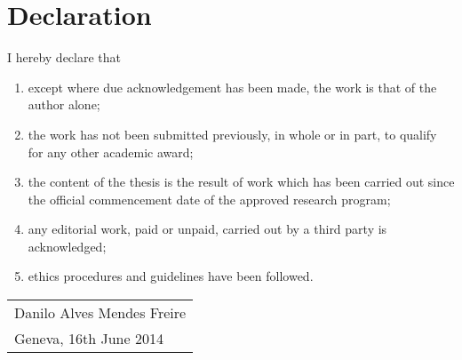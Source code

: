

\chapter*{Declaration} %

\thispagestyle{empty}

 
I hereby declare that

\begin{enumerate}
\item except where due acknowledgement has been made, the work is that of the author alone;
\item the work has not been submitted previously, in whole or in part, to qualify for any other academic award;
\item the content of the thesis is the result of work which has been carried out since the official commencement date of the approved research program;
\item any editorial work, paid or unpaid, carried out by a third party is acknowledged;
\item ethics procedures and guidelines have been followed.
\end{enumerate}

\bigskip
 

\smallskip

\begin{flushright}
\begin{tabular}{m{6cm}}
\\ \hline
\centering Danilo Alves Mendes Freire\\Geneva, 16th June 2014
\end{tabular}
\end{flushright}
